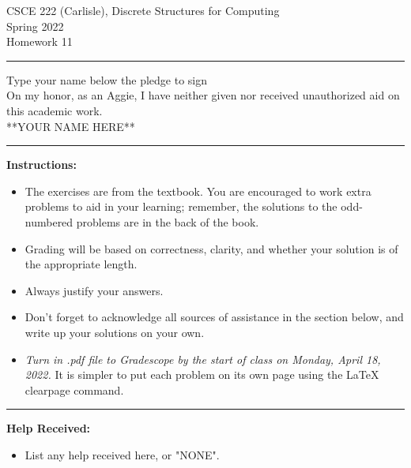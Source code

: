 \documentclass[12pt]{article}  %
\begin{document}
\begin{center}         %
{\large                %
CSCE 222 (Carlisle), Discrete Structures for Computing \\  %
Spring 2022 \\
Homework 11}
\end{center}
\rule{6in}{.1pt}       %
\begin{center}
{\large
Type your name below the pledge to sign\\
On my honor, as an Aggie, I have neither given nor received unauthorized aid on this academic work.\\
**YOUR NAME HERE**}
\end{center}


\rule{6in}{.1pt}       %
                    
\noindent              %
{\bf Instructions:}    %

\begin{itemize}        %
\item The exercises are from the textbook.  You are encouraged to work
      extra problems to aid in your learning; remember, the solutions to 
      the odd-numbered problems are in the back of the book.
\item Grading will be based on correctness, clarity, and whether your
      solution is of the appropriate length.
\item Always justify your answers.
\item Don't forget to acknowledge all sources of assistance in the section below, and write up your solutions on your own.
\item {\em Turn in .pdf file to Gradescope by the start of class on Monday, April 18, 2022.}  It is simpler to put each problem on its own page using the LaTeX clearpage command.
\end{itemize}


\rule{6in}{.1pt}       %

{\bf Help Received:}    %
\begin{itemize}
\item List any help received here, or "NONE".
\end{itemize}
\end{document}
